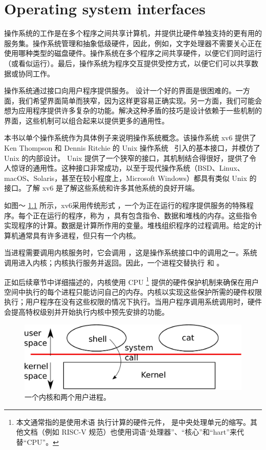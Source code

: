 \documentclass[UTF8]{article}
\begin{document}
   \chapter{Operating system interfaces}   
    \label{CH:UNIX}     

操作系统的工作是在多个程序之间共享计算机，并提供比硬件单独支持的更有用的服务集。操作系统管理和抽象低级硬件，因此，例如，文字处理器不需要关心正在使用哪种类型的磁盘硬件。操作系统在多个程序之间共享硬件，以便它们同时运行（或看似运行）。最后，操作系统为程序交互提供受控方式，以便它们可以共享数据或协同工作。  

操作系统通过接口向用户程序提供服务。
        设计一个好的界面是很困难的。一方面，我们希望界面简单而狭窄，因为这样更容易正确实现。另一方面，我们可能会想为应用程序提供许多复杂的功能。解决这种矛盾的技巧是设计依赖于一些机制的界面，这些机制可以组合起来以提供更多的通用性。  

本书以单个操作系统作为具体例子来说明操作系统概念。该操作系统 xv6 提供了 Ken Thompson 和 Dennis Ritchie 的 Unix 操作系统~    \cite{unix}    引入的基本接口，并模仿了 Unix 的内部设计。 Unix 提供了一个狭窄的接口，其机制结合得很好，提供了令人惊讶的通用性。这种接口非常成功，以至于现代操作系统（BSD、Linux、macOS、Solaris，甚至在较小程度上，Microsoft Windows）都具有类似 Unix 的接口。了解 xv6 是了解这些系统和许多其他系统的良好开端。  

如图〜   \ref{fig:os}   所示，xv6采用传统形式
        ，一个为正在运行的程序提供服务的特殊程序。每个正在运行的程序，称为
        ，具有包含指令、数据和堆栈的内存。这些指令实现程序的计算。数据是计算所作用的变量。堆栈组织程序的过程调用。给定的计算机通常具有许多进程，但只有一个内核。  

当进程需要调用内核服务时，它会调用        ，这是操作系统接口中的调用之一。系统调用进入内核；内核执行服务并返回。因此，一个进程交替执行
        和
        。  

正如后续章节中详细描述的，内核使用 CPU    \footnote{本文通常指的是使用术语        执行计算的硬件元件，       是中央处理单元的缩写。其他文档（例如 RISC-V 规范）也使用词语“处理器”、“核心”和“hart”来代替“CPU”。  }    提供的硬件保护机制来确保在用户空间中执行的每个进程只能访问自己的内存。内核以实现这些保护所需的硬件权限执行；用户程序在没有这些权限的情况下执行。当用户程序调用系统调用时，硬件会提高特权级别并开始执行内核中预先安排的功能。  

   \begin{figure}[t]
\center
\includegraphics[scale=0.5]{fig/os.pdf}
\caption{一个内核和两个用户进程。  }
\label{fig:os}
\end{figure}     
\end{document}
